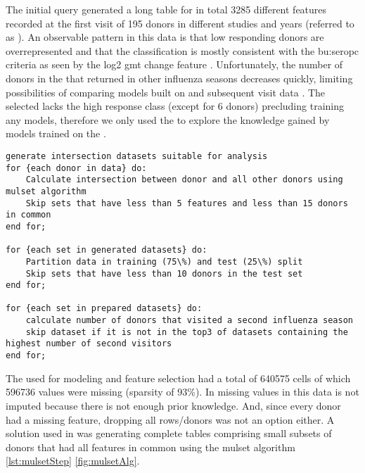 The initial query generated a long table for in total 3285 different features recorded at the first visit of 195 donors in different studies and years (referred to as \firstvis).
An observable pattern in this data is that low responding donors are overrepresented and that the classification is mostly consistent with the \gls{bu:seropc} criteria as seen by the log2 \acrshort{gmt} change feature .
Unfortunately, the number of donors in the \firstvis that returned in other influenza seasons decreases quickly, limiting possibilities of comparing models built on \firstvis and subsequent visit data .
The selected \secondvis lacks the high response class (except for 6 donors) precluding training any models, therefore we only used the \secondvis to explore the knowledge gained by models trained on the \firstvis {}.

\begin{minipage}{\linewidth}
\begin{lstlisting}[caption=Applying the mulset algorithm and preparing the data, label={lst:mulsetStep}]
generate intersection datasets suitable for analysis
for {each donor in data} do:
    Calculate intersection between donor and all other donors using mulset algorithm
    Skip sets that have less than 5 features and less than 15 donors in common
end for;

for {each set in generated datasets} do:
    Partition data in training (75\%) and test (25\%) split
    Skip sets that have less than 10 donors in the test set
end for;

for {each set in prepared datasets} do:
    calculate number of donors that visited a second influenza season
    skip dataset if it is not in the top3 of datasets containing the highest number of second visitors
end for;
\end{lstlisting}
\end{minipage}

The \firstvis used for modeling and feature selection had a total of 640575 cells of which 596736 values were missing (sparsity of 93\%).
In \spaper missing values in this data is not imputed because there is not enough prior knowledge.
And, since every donor had a missing feature, dropping all rows/donors was not an option either.
A solution used in \spaper was generating complete tables comprising small subsets of donors that had all features in common using the mulset algorithm \autoref{lst:mulsetStep} \autoref{fig:mulsetAlg}.

